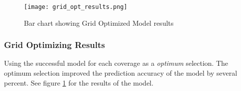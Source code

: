 \begin{figure}[h]
    \centering
    \texttt{[image: grid\_opt\_results.png]}
    \caption{Bar chart showing Grid Optimized Model results}
    \label{fig:grid_opt_barplot}
\end{figure}
\subsubsection{Grid Optimizing Results}
Using the successful model for each coverage as a \textit{optimum} selection.
The optimum selection improved the prediction accuracy of the model by several percent.
See figure \ref{fig:grid_opt_barplot} for the results of the model.


